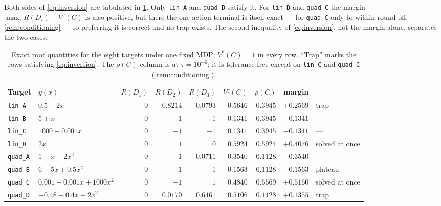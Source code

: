 \documentclass[11pt, a4paper]{article}
\theoremstyle{definition}
\begin{document}
Both sides of \eqref{eq:inversion} are tabulated in \cref{tab:family}.  Only
\texttt{lin\_A} and \texttt{quad\_D} satisfy it.  For \texttt{lin\_D} and
\texttt{quad\_C} the margin \(\max_iR(D_i)-V^q(C)\) is also positive, but there
the one-action terminal is itself exact --- for \texttt{quad\_C} only to
within round-off, \cref{rem:conditioning} --- so preferring it is correct and
no trap exists.  The second inequality of \eqref{eq:inversion}, not the margin
alone, separates the two cases.

\begin{table}[thbp!]
    \centering
    \footnotesize
    \renewcommand{\arraystretch}{1.15}
    \begin{tabular}{@{}llrrrrrrl@{}}
        \toprule
        Target & \(y(x)\)
        & \(R(D_1)\) & \(R(D_2)\) & \(R(D_3)\)
        & \(V^q(C)\) & \(\rho(C)\) & margin & \\
        \midrule
        \texttt{lin\_A}  & \(0.5+2x\)              & \(0\) & \(0.8214\)  & \(-0.0793\) & \(0.5646\) & \(0.3945\) & \(+0.2569\) & trap \\
        \texttt{lin\_B}  & \(5+x\)                 & \(0\) & \(-1\)      & \(-1\)      & \(0.1341\) & \(0.3945\) & \(-0.1341\) & --- \\
        \texttt{lin\_C}  & \(1000+0.001x\)         & \(0\) & \(-1\)      & \(-1\)      & \(0.1341\) & \(0.3945\) & \(-0.1341\) & --- \\
        \texttt{lin\_D}  & \(2x\)                  & \(0\) & \(1\)       & \(0\)       & \(0.5924\) & \(0.5924\) & \(+0.4076\) & solved at once \\
        \texttt{quad\_A} & \(1-x+2x^2\)            & \(0\) & \(-1\)      & \(-0.0711\) & \(0.3540\) & \(0.1128\) & \(-0.3540\) & --- \\
        \texttt{quad\_B} & \(6-5x+0.5x^2\)         & \(0\) & \(-1\)      & \(-1\)      & \(0.1563\) & \(0.1128\) & \(-0.1563\) & plateau \\
        \texttt{quad\_C} & \(0.001+0.001x+1000x^2\)& \(0\) & \(-1\)      & \(1\)       & \(0.4840\) & \(0.5569\) & \(+0.5160\) & solved at once \\
        \texttt{quad\_D} & \(-0.48+0.4x+2x^2\)     & \(0\) & \(0.0170\)  & \(0.6461\)  & \(0.5106\) & \(0.1128\) & \(+0.1355\) & trap \\
        \bottomrule
    \end{tabular}
    \caption{Exact root quantities for the eight targets under one fixed MDP;
    \(V^*(C)=1\) in every row.  ``Trap'' marks the rows satisfying
    \eqref{eq:inversion}.  The \(\rho(C)\) column is at \(\tau=10^{-6}\); it is
    tolerance-free except on \texttt{lin\_C} and \texttt{quad\_C}
    (\cref{rem:conditioning}).}
    \label{tab:family}
\end{table}
\end{document}
